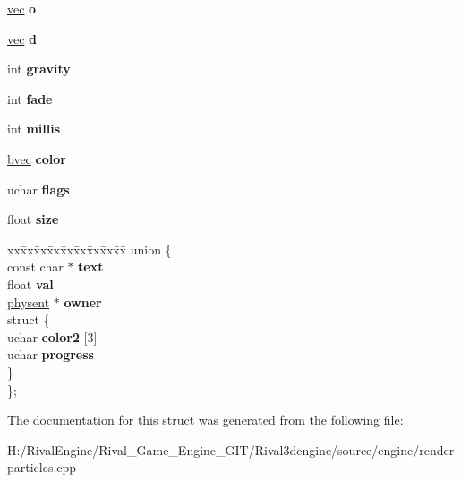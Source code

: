 \begin{DoxyCompactItemize}
\item 
\mbox{\label{structparticle_ae1328520473733ec6da77724b8c37aa2}} 
\hyperlink{structvec}{vec} {\bfseries o}
\item 
\mbox{\label{structparticle_a44a88fb92360397b5aef797d197b8b09}} 
\hyperlink{structvec}{vec} {\bfseries d}
\item 
\mbox{\label{structparticle_a8f3c11077de31e58d16a66c6b3b86ff2}} 
int {\bfseries gravity}
\item 
\mbox{\label{structparticle_a2f9b95d6f83aca6766ec0ad04416cc0a}} 
int {\bfseries fade}
\item 
\mbox{\label{structparticle_a7de614e72dddeb6a766a4ca8b07f28ce}} 
int {\bfseries millis}
\item 
\mbox{\label{structparticle_a18c314c5399c8c229740b5a466db3c83}} 
\hyperlink{structbvec}{bvec} {\bfseries color}
\item 
\mbox{\label{structparticle_a132f8ff288d176915d3a9574827fb0fb}} 
uchar {\bfseries flags}
\item 
\mbox{\label{structparticle_a716a281ff43e1881363fd1123f870f0e}} 
float {\bfseries size}
\item 
\mbox{\label{structparticle_a972ab3a1757640b8d10d070daaafc4a6}} 
\begin{tabbing}
xx\=xx\=xx\=xx\=xx\=xx\=xx\=xx\=xx\=\kill
union \{\\
\>const char $\ast$ {\bfseries text}\\
\>float {\bfseries val}\\
\>\hyperlink{structphysent}{physent} $\ast$ {\bfseries owner}\\
\mbox{\label{unionparticle_1_1_0D66_a61936ffd8a06e3d56c75896ec211e0e4}} 
\>struct \{\\
\>\>uchar {\bfseries color2} \mbox{[}3\mbox{]}\\
\>\>uchar {\bfseries progress}\\
\>\} \\
\}; \\

\end{tabbing}\end{DoxyCompactItemize}


The documentation for this struct was generated from the following file\+:\begin{DoxyCompactItemize}
\item 
H\+:/\+Rival\+Engine/\+Rival\+\_\+\+Game\+\_\+\+Engine\+\_\+\+G\+I\+T/\+Rival3dengine/source/engine/renderparticles.\+cpp\end{DoxyCompactItemize}
